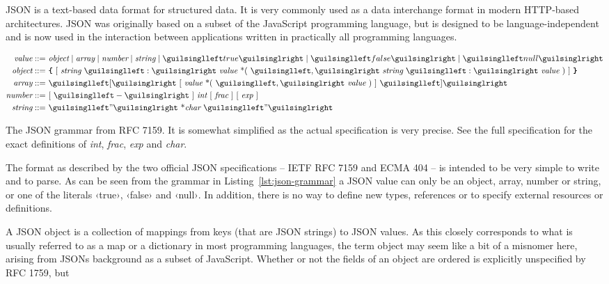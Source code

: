 JSON is a text-based data format for structured data. It is very commonly used as a data interchange format in modern HTTP-based architectures. JSON was originally based on a subset of the JavaScript programming language, but is designed to be language-independent and is now used in the interaction between applications written in practically all programming languages.

\begin{listing}[ht!]
\begin{align*}
\textit{value} ::=  &\ \textit{object} \mid \textit{array} \mid \textit{number} \mid \textit{string} \mid ‹true› \mid ‹false› \mid ‹null› \\
\textit{object} ::=  &\ \icode{\{}\ [\ \textit{string}\ ‹:›\ \textit{value}\ \text{*}(\ ‹,›\ \textit{string}\ ‹:›\ \textit{value}\ )\ ]\ \icode{\}} \\
\textit{array} ::= &\ ‹[›\ [\ \textit{value}\ \text{*}(\ ‹,›\ \textit{value}\ )\ ]\ ‹]› \\
\textit{number} ::= &\ [\ ‹-›\ ]\ \textit{int}\ [\ \textit{frac}\ ]\ [\ \textit{exp}\ ]\ \\
\textit{string} ::= &\ ‹"›\ \text{*}\textit{char}\ ‹"›
\end{align*}
\caption[The JSON grammar]{The JSON grammar from RFC 7159. It is somewhat simplified as the actual specification is very precise. See the full specification for the exact definitions of \textit{int}, \textit{frac}, \textit{exp} and \textit{char}.}
\label{lst:json-grammar}
\end{listing}

The format as described by the two official JSON specifications -- IETF RFC 7159\cite{RFC7159} and ECMA 404\cite{ECMA404} -- is intended to be very simple to write and to parse. As can be seen from the grammar in Listing~\ref{lst:json-grammar} a JSON value can only be an object, array, number or string, or one of the literals ‹true›, ‹false› and ‹null›. In addition, there is no way to define new types, references or to specify external resources or definitions.

A JSON object is a collection of mappings from keys (that are JSON strings) to JSON values. As this closely corresponds to what is usually referred to as a map or a dictionary in most programming languages, the term object may seem like a bit of a misnomer here, arising from JSONs background as a subset of JavaScript. Whether or not the fields of an object are ordered is explicitly unspecified by RFC 1759, but \cite[6]{RFC7159}


